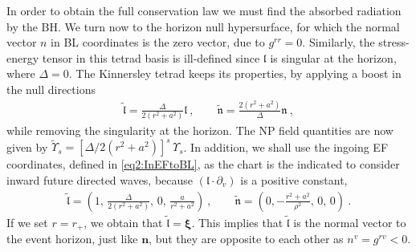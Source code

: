 In order to obtain the full conservation law we must find the absorbed radiation by the BH. We turn now to the horizon null hypersurface, for which the normal vector $n$ in BL coordinates is the zero vector, due to $g^{rr}=0$.
Similarly, the stress-energy tensor in this tetrad basis is ill-defined since $\bm{\mathfrak{l}}$ is singular at the horizon, where $\Delta=0$.
The Kinnersley tetrad keeps its properties, by applying a boost in the null directions
\begin{align}
   \bm{\tilde{\mathfrak{l}}} = \frac{\Delta}{2 (r^2+a^2)} \bm{\mathfrak{l}} ~,\qquad \bm{\tilde{\mathfrak{n}}} = \frac{2 (r^2+a^2)}{\Delta} \bm{\mathfrak{n}} ~,
\end{align}
while removing the singularity at the horizon. The NP field quantities are now given by $\tilde{\Upsilon}_s = [\Delta/2(r^2+a^2)]^s \,\Upsilon_s$.
In addition, we shall use the ingoing EF coordinates, defined in \eqref{eq2:InEFtoBL}, as the chart is the indicated to consider inward future directed waves, because $(\bm{\mathfrak{l}}\cdot\partial_v)$ is a positive constant,
\begin{align}
    \bm{\tilde{\mathfrak{l}}} = \left(1, \,\frac{\Delta}{2(r^2+a^2)}, \,0, \,\frac{a}{r^2 + a^2} \right) ~,\qquad \bm{\tilde{\mathfrak{n}}} = \left(0, -\frac{r^2+a^2}{\rho^2}, \,0, \,0\right) ~.
\end{align}
If we set $r=r_{+}$, we obtain that $\bm{\tilde{\mathfrak{l}}} = \bm{\xi}$.
This implies that $\bm{\tilde{\mathfrak{l}}}$ is the normal vector to the event horizon, just like $\bm{n}$, but they are opposite to each other as $n^v = g^{rv}<0$.


